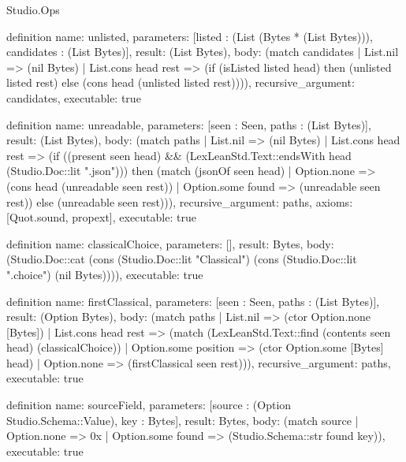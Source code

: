 \begin{lexlean}{Studio.Ops}
\begin{semanticmodule}
definition{
  name: unlisted,
  parameters: [listed : (List (Bytes * (List Bytes))), candidates : (List Bytes)],
  result: (List Bytes),
  body: (match candidates
    | List.nil => (nil Bytes)
    | List.cons head rest => (if (isListed listed head) then (unlisted listed rest) else (cons head (unlisted listed rest)))),
  recursive_argument: candidates,
  executable: true
}


definition{
  name: unreadable,
  parameters: [seen : Seen, paths : (List Bytes)],
  result: (List Bytes),
  body: (match paths
    | List.nil => (nil Bytes)
    | List.cons head rest => (if ((present seen head) && (LexLeanStd.Text::endsWith head (Studio.Doc::lit ".json"))) then (match (jsonOf seen head)
      | Option.none => (cons head (unreadable seen rest))
      | Option.some found => (unreadable seen rest)) else (unreadable seen rest))),
  recursive_argument: paths,
  axioms: [Quot.sound, propext],
  executable: true
}

definition{
  name: classicalChoice,
  parameters: [],
  result: Bytes,
  body: (Studio.Doc::cat (cons (Studio.Doc::lit "Classical") (cons (Studio.Doc::lit ".choice") (nil Bytes)))),
  executable: true
}

definition{
  name: firstClassical,
  parameters: [seen : Seen, paths : (List Bytes)],
  result: (Option Bytes),
  body: (match paths
    | List.nil => (ctor Option.none [Bytes])
    | List.cons head rest => (match (LexLeanStd.Text::find (contents seen head) (classicalChoice))
      | Option.some position => (ctor Option.some [Bytes] head)
      | Option.none => (firstClassical seen rest))),
  recursive_argument: paths,
  executable: true
}



definition{
  name: sourceField,
  parameters: [source : (Option Studio.Schema::Value), key : Bytes],
  result: Bytes,
  body: (match source
    | Option.none => 0x
    | Option.some found => (Studio.Schema::str found key)),
  executable: true
}


\end{semanticmodule}
\end{lexlean}
